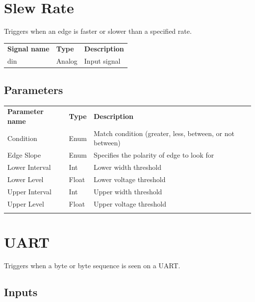 \section{Slew Rate}

Triggers when an edge is faster or slower than a specified rate.

\begin{tabularx}{16cm}{llX}
\thickhline
\textbf{Signal name} & \textbf{Type} & \textbf{Description} \\
\thickhline
din & Analog & Input signal \\
\end{tabularx}

\subsection{Parameters}

\begin{tabularx}{16cm}{llX}
\thickhline
\textbf{Parameter name} & \textbf{Type} & \textbf{Description} \\
\thickhline
Condition & Enum & Match condition (greater, less, between, or not between) \\
\thickhline
Edge Slope & Enum & Specifies the polarity of edge to look for\\
\thickhline
Lower Interval & Int & Lower width threshold\\
\thickhline
Lower Level & Float & Lower voltage threshold\\
\thickhline
Upper Interval & Int & Upper width threshold\\
\thickhline
Upper Level & Float & Upper voltage threshold\\
\thickhline
\end{tabularx}

\section{UART}

Triggers when a byte or byte sequence is seen on a UART.

\subsection{Inputs}

